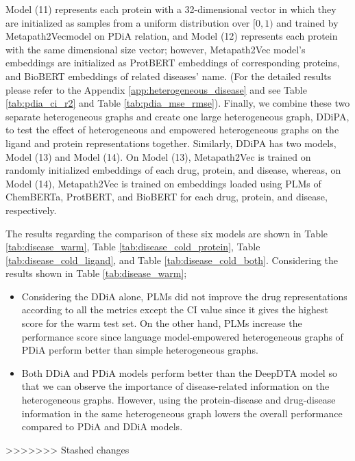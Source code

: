 Model (11) represents each protein with a 32-dimensional vector in which they are initialized as samples from a uniform distribution over $[0, 1)$ and trained by Metapath2Vecmodel on PDiA relation, and Model (12) represents each protein with the same dimensional size vector; however, Metapath2Vec model's embeddings are initialized as ProtBERT embeddings of corresponding proteins, and BioBERT embeddings of related diseases' name. (For the detailed results please refer to the Appendix \ref{app:heterogeneous_disease} and see Table \ref{tab:pdia_ci_r2} and Table \ref{tab:pdia_mse_rmse}). Finally, we combine these two separate heterogeneous graphs and create one large heterogeneous graph, DDiPA, to test the effect of heterogeneous and empowered heterogeneous graphs on the ligand and protein representations together. Similarly, DDiPA has two models, Model (13) and Model (14). On Model (13), Metapath2Vec is trained on randomly initialized embeddings of each drug, protein, and disease, whereas, on Model (14), Metapath2Vec is trained on embeddings loaded using PLMs of ChemBERTa, ProtBERT, and BioBERT for each drug, protein, and disease, respectively.



\newpage
The results regarding the comparison of these six models are shown in Table \ref{tab:disease_warm}, Table \ref{tab:disease_cold_protein}, Table  \ref{tab:disease_cold_ligand}, and Table \ref{tab:disease_cold_both}. Considering the results shown in Table \ref{tab:disease_warm};

\begin{itemize}
    \item Considering the DDiA alone, PLMs did not improve the drug representations according to all the metrics except the CI value since it gives the highest score for the warm test set. On the other hand, PLMs increase the performance score since language model-empowered heterogeneous graphs of PDiA perform better than simple heterogeneous graphs. 
    \item Both DDiA and PDiA models perform better than the DeepDTA model so that we can observe the importance of disease-related information on the heterogeneous graphs. However, using the protein-disease and drug-disease information in the same heterogeneous graph lowers the overall performance compared to PDiA and DDiA models. 
\end{itemize}
>>>>>>> Stashed changes



